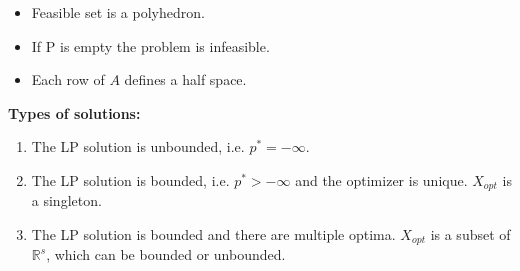 \documentclass[8pt,a4paper]{scrartcl}
\begin{document}
\begin{multicols*}{3}
\begin{multicols*}{4}
{\begin{itemize}

\item Feasible set is a polyhedron.
\item If P is empty the problem is infeasible.
\item Each row of $A$ defines a half space.
\end{itemize}


\textbf{Types of solutions:}

\begin{enumerate}

\item The LP solution is unbounded, i.e. $p^\ast =-\infty$.
\item The LP solution is bounded, i.e. $p^\ast > -\infty$ and the optimizer is unique. $X_{opt}$ is a singleton.
\item The LP solution is bounded and there are multiple optima. $X_{opt}$ is a subset of $\mathbb{R}^s$, which can be bounded or unbounded.
\end{enumerate}
}%


\end{multicols*}
\end{multicols*}
\end{document}
